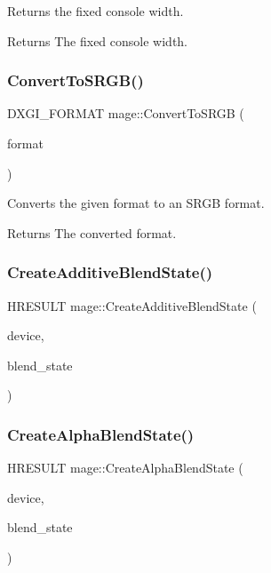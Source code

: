 Returns the fixed console width.

\begin{DoxyReturn}{Returns}
The fixed console width. 
\end{DoxyReturn}
\hypertarget{namespacemage_a9d84163ab692956f5f4537a965238a09}{}\label{namespacemage_a9d84163ab692956f5f4537a965238a09} 
\subsubsection{\texorpdfstring{Convert\+To\+S\+R\+G\+B()}{ConvertToSRGB()}}
{\footnotesize\ttfamily D\+X\+G\+I\+\_\+\+F\+O\+R\+M\+AT mage\+::\+Convert\+To\+S\+R\+GB (\begin{DoxyParamCaption}\item[{D\+X\+G\+I\+\_\+\+F\+O\+R\+M\+AT}]{format }\end{DoxyParamCaption})}

Converts the given format to an S\+R\+GB format.

\begin{DoxyReturn}{Returns}
The converted format. 
\end{DoxyReturn}
\hypertarget{namespacemage_a5c813464cd190784dec2d505d3254917}{}\label{namespacemage_a5c813464cd190784dec2d505d3254917} 
\subsubsection{\texorpdfstring{Create\+Additive\+Blend\+State()}{CreateAdditiveBlendState()}}
{\footnotesize\ttfamily H\+R\+E\+S\+U\+LT mage\+::\+Create\+Additive\+Blend\+State (\begin{DoxyParamCaption}\item[{I\+D3\+D11\+Device2 $\ast$}]{device,  }\item[{I\+D3\+D11\+Blend\+State $\ast$$\ast$}]{blend\+\_\+state }\end{DoxyParamCaption})}

\hypertarget{namespacemage_a334c4403848e086f84b328883ff387cc}{}\label{namespacemage_a334c4403848e086f84b328883ff387cc} 
\subsubsection{\texorpdfstring{Create\+Alpha\+Blend\+State()}{CreateAlphaBlendState()}}
{\footnotesize\ttfamily H\+R\+E\+S\+U\+LT mage\+::\+Create\+Alpha\+Blend\+State (\begin{DoxyParamCaption}\item[{I\+D3\+D11\+Device2 $\ast$}]{device,  }\item[{I\+D3\+D11\+Blend\+State $\ast$$\ast$}]{blend\+\_\+state }\end{DoxyParamCaption})}

